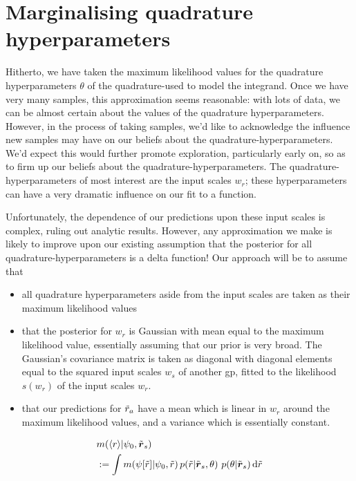 \documentclass{article}
\begin{document}
\section{Marginalising quadrature hyperparameters}

Hitherto, we have taken the maximum likelihood values for the quadrature hyperparameters $\theta$ of the quadrature-\gpb used to model the integrand. Once we have very many samples, this approximation seems reasonable: with lots of data, we can be almost certain about the values of the quadrature hyperparameters. However, in the process of taking samples, we'd like to acknowledge the influence new samples may have on our beliefs about the quadrature-hyperparameters. We'd expect this would further promote exploration, particularly early on, so as to firm up our beliefs about the quadrature-hyperparameters. The quadrature-hyperparameters of most interest are the input scales $w_r$; these hyperparameters can have a very dramatic influence on our fit to a function.

Unfortunately, the dependence of our predictions upon these input scales is complex, ruling out analytic results. However, any approximation we make is likely to improve upon our existing assumption that the posterior for all quadrature-hyperparameters is a delta function! Our approach will be to assume that
\begin{itemize}
\item all quadrature hyperparameters aside from the input scales are taken as their maximum likelihood values
 \item that the posterior for $w_r$ is Gaussian with mean equal to the maximum likelihood value, essentially assuming that our prior is very broad. The Gaussian's covariance matrix is taken as diagonal with diagonal elements equal to the squared input scales $w_s$ of another gp, fitted to the likelihood $s(w_r)$ of the input scales $w_r$. 
\item that our predictions for $\tr_a$ have a mean which is linear in $w_r$ around the maximum likelihood values, and a variance which is essentially constant.  
\end{itemize}
 

\begin{align*}
& \mean{\inty{r}}{\psi_0,\tvr_s} \\
& \deq \int \mean{\psi[\tr]}{\psi_0,\tr}
\p{\tr}{\tvr_s, \theta}\, \p{\theta}{\tvr_s}\ud \tr 
\end{align*}



\end{document}
